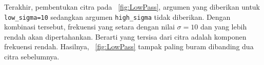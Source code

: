 Terakhir, pembentukan citra pada \figurename~\ref{fig:LowPass}, argumen yang diberikan untuk \texttt{low\_sigma=10} sedangkan argumen \texttt{high\_sigma} tidak diberikan. Dengan kombinasi tersebut, frekuensi yang setara dengan nilai $\sigma=10$ dan yang lebih rendah akan dipertahankan. Berarti yang tersisa dari citra adalah komponen frekuensi rendah. Hasilnya, \figurename~\ref{fig:LowPass} tampak paling buram dibanding dua citra sebelumnya.

\begin{figure}
\begin{center}

\end{center}
\end{figure}
